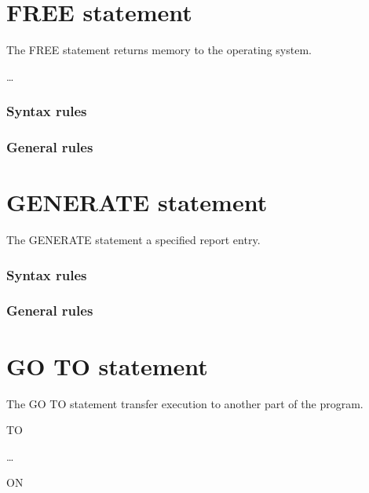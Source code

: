 \section{FREE statement}

The FREE statement returns memory to the operating system.

\begin{syntax}
  \begin{1=}
    \identifier
  \end{1=} \ldots
\end{syntax}

\subsubsection{Syntax rules}

\subsubsection{General rules}

\section{GENERATE statement}

The GENERATE statement a specified report entry.

\begin{syntax}
\end{syntax}

\subsubsection{Syntax rules}

\subsubsection{General rules}

\section{GO TO statement}

The GO TO statement transfer execution to another part of the program.

\begin{syntax}
   TO
  \begin{1=}
    \procedurename
  \end{1=} \ldots
  \begin{0-1}
     ON \identifier
  \end{0-1}
\end{syntax}

